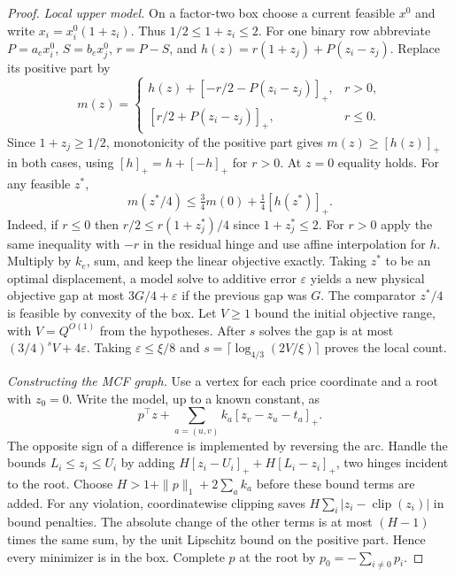 \documentclass[11pt,letterpaper]{article}
\begin{document}
\begin{proof}
\emph{Local upper model.}
On a factor-two box choose a current feasible $x^0$ and write
$x_i=x_i^0(1+z_i)$. Thus $1/2\le1+z_i\le2$. For one binary row abbreviate
$P=a_e x_i^0$, $S=b_e x_j^0$, $r=P-S$, and
$h(z)=r(1+z_j)+P(z_i-z_j)$. Replace its positive part by
\[
 m(z)=
 \begin{cases}
 h(z)+[-r/2-P(z_i-z_j)]_+, &r>0,\\
 [r/2+P(z_i-z_j)]_+, &r\le0 .
 \end{cases}
\]
Since $1+z_j\ge1/2$, monotonicity of the positive part gives
$m(z)\ge[h(z)]_+$ in both cases, using $[h]_+=h+[-h]_+$ for $r>0$.
At $z=0$ equality holds. For any feasible $z^*$,
\[
 m(z^*/4)\le \tfrac34m(0)+\tfrac14[h(z^*)]_+ .
\]
Indeed, if $r\le0$ then $r/2\le r(1+z_j^*)/4$ since $1+z_j^*\le2$.
For $r>0$ apply the same inequality with $-r$ in the residual hinge and
use affine interpolation for $h$. Multiply by $k_e$, sum, and keep the
linear objective exactly. Taking $z^*$ to be an optimal displacement, a
model solve to additive error $\varepsilon$ yields a new physical objective
gap at most $3G/4+\varepsilon$ if the previous gap was $G$. The comparator
$z^*/4$ is feasible by convexity of the box. Let $V\ge1$ bound the initial
objective range, with $V=Q^{O(1)}$ from the hypotheses. After $s$ solves the gap
is at most $(3/4)^sV+4\varepsilon$. Taking $\varepsilon\le\xi/8$ and
$s=\lceil\log_{4/3}(2V/\xi)\rceil$ proves the local count.

\emph{Constructing the MCF graph.}
Use a vertex for each price coordinate and a root with $z_0=0$.
Write the model, up to a known constant, as
\[
 p^\top z+\sum_{a=(u,v)} k_a[z_v-z_u-t_a]_+ .
\]
The opposite sign of a difference is implemented by reversing the arc.
Handle the bounds $L_i\le z_i\le U_i$ by adding
$H[z_i-U_i]_++H[L_i-z_i]_+$, two hinges incident to the root. Choose
$H>1+\|p\|_1+2\sum_a k_a$ before these bound terms are added.
For any violation, coordinatewise clipping saves
$H\sum_i|z_i-\operatorname{clip}(z_i)|$ in bound penalties. The absolute
change of the other terms is at most $(H-1)$ times the same sum, by the
unit Lipschitz bound on the positive part. Hence every minimizer is in the
box. Complete $p$ at the root by $p_0=-\sum_{i\ne0}p_i$.


\end{proof}
\end{document}

